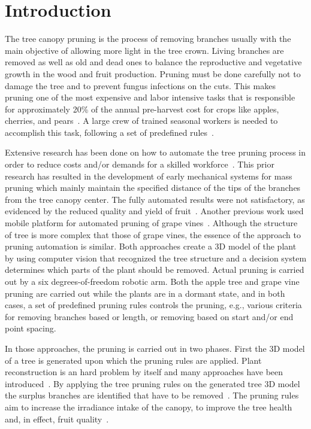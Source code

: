 \section{Introduction}
The tree canopy pruning is the process of removing branches usually with the main
objective of allowing more light in the tree crown. Living branches are
removed as well as old and dead ones to balance the reproductive and
vegetative growth in the wood and fruit production. Pruning must be done carefully not to damage the tree and to prevent fungus infections on the cuts. This makes pruning one of the most expensive and labor intensive tasks that is responsible for approximately 20\% of the annual pre-harvest cost for crops like apples, cherries, and pears~\cite{karkee_identification_2014}. A large crew of trained seasonal workers is needed to accomplish this task, following a set of predefined rules~\cite{akbar_novel_2016}. 

Extensive research has been done on how to automate the tree pruning process in order to reduce costs and/or demands for a skilled workforce~\cite{jensen_effects_1980,karkee_identification_2014,moore_mechanical_1958}. This prior research has resulted in the development of early mechanical systems for mass pruning which mainly maintain the specified distance of the tips of the branches from the tree canopy center. The
fully automated results were not satisfactory, as evidenced by the reduced quality and
yield of fruit~\cite{karkee_identification_2014}. 
Another previous work used mobile platform for automated pruning of grape vines~\cite{botterill_robot_2017}. 
Although the structure of tree is more complex that those of
grape vines, the essence of the approach to pruning automation is
similar. Both approaches create a 3D model of the plant by using computer vision
that recognized the tree structure and a decision system determines which
parts of the plant should be removed. Actual pruning is carried out by a six degrees-of-freedom
robotic arm. Both the apple tree and grape vine pruning are carried out while
the plants are in a dormant state, and in both cases, a set of
predefined pruning rules controls the pruning, e.g., various criteria for removing branches based or length, or removing based on start and/or end point spacing.

In those approaches, the pruning is carried out in two phases. First the 3D model of a tree is generated upon which the pruning rules are applied. Plant reconstruction is an hard problem by itself and many approaches have been introduced~\cite{livny_automatic_2010,xie_tree_2016,zhang_data-driven_2014}. 
By applying the tree pruning rules on the generated tree 3D model the
surplus branches are identified that have to be removed~\cite{akbar_novel_2016,elfiky_automation_2015,medeiros_modeling_2017}.
The pruning rules aim to increase the irradiance intake of the canopy,  to improve the tree health~\cite{simon_does_2006} and, in effect, fruit quality~\cite{bastias_light_2012}. 


